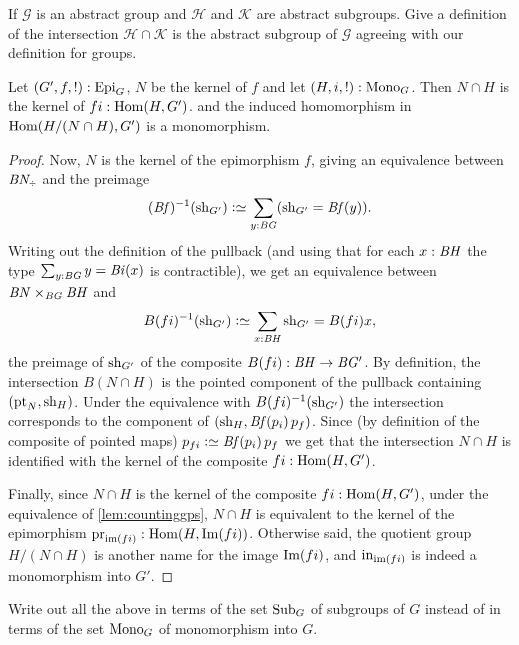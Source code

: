 \begin{xca}
  If $\mathcal G$ is an abstract group and $\mathcal H$ and $\mathcal K$ are abstract subgroups.  Give a definition of the intersection $\mathcal H\cap\mathcal K$ is the abstract subgroup of $\mathcal G$ agreeing with our definition for groups.
\end{xca}
\begin{lemma}
  \label{lem:whatSylow2needs}
  Let $(G',f,!):\mathrm{Epi}_G$, $N$ be the kernel of $f$  and let $(H,i,!):\mathrm{Mono}_G$.  Then
$N\cap H$ is the kernel of $fi:\Hom(H,G')$.  %
and the induced homomorphism in $\Hom(H/(N\cap H),G')$ is a monomorphism.
  \begin{proof}
Now, $N$ is the kernel of the epimorphism $f$, giving an equivalence between $\BN_\div$ and the preimage
$$(\Bf)^{-1}(\shape_{G'})\defequi\sum_{y:\BG}(\shape_{G'}=\Bf(y)).$$
Writing out the definition of the pullback (and using that for each $x:\mathit{B}\mathit{H}$ the type $\sum_{y:\mathit{B}\mathit{G}}y=\mathit{B}\mathit{i}(x)$ is contractible), we get an equivalence between $\mathit{B}\mathit{N}\times_{\mathit{B}\mathit{G}}\mathit{B}\mathit{H}$ and
$$B(fi)^{-1}(\shape_{G'})\defequi\sum_{x:\BH}\shape_{G'}=B(fi)x,$$
the preimage of $\mathrm{sh}_{G'}$ of the composite $B(fi):\mathit{B}\mathit{H}\to \mathit{B}\mathit{G}'$.
 By definition, the intersection $B(N\cap H)$ is the pointed component of the pullback containing $(\mathrm{pt}_N,\mathrm{sh}_H)$.  Under the equivalence with $B(fi)^{-1}(\mathrm{sh}_{G'})$ the intersection corresponds to the component of $(\shape_H,\Bf(p_i)\,p_f)%
 $.
Since (by definition of the composite of pointed maps) $p_{fi}\defequi \Bf(p_i)\,p_f$ we get that the intersection $N\cap H$ is identified with the kernel of the composite $fi:\Hom(H,G')$.

Finally, since $N\cap H$ is the kernel of the composite $fi:\Hom(H,G')$, under the equivalence of \cref{lem:countinggps}, $N\cap H$ is equivalent to the kernel of the epimorphism $\prj_{\img(fi)}:\Hom(H,\image (fi))$.  Otherwise said, the quotient group $H/(N\cap H)$ is another name for the image $\Img (fi)$, and $\incl_{\img(fi)}$ is indeed a monomorphism into $G'$.
  \end{proof}
\end{lemma}
\begin{xca}
  Write out all the above in terms of the set $\mathrm{Sub}_G$ of subgroups of $G$ instead of in terms of the set $\mathrm{Mono}_G$ of monomorphism into $G$.
\end{xca}


